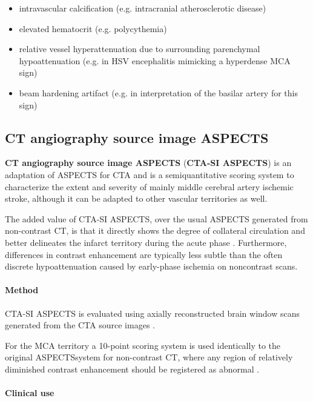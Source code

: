 \begin{tcolorbox}[colback=green!5!white,colframe=green!75!white,title=Differential diagnosis]
\begin{itemize}
	\item
	intravascular calcification (e.g. intracranial atherosclerotic disease)
	\item
	elevated hematocrit (e.g. polycythemia)
	\item
	relative vessel hyperattenuation due to surrounding parenchymal hypoattenuation (e.g. in HSV encephalitis mimicking a hyperdense MCA sign)
	\item
	beam hardening artifact (e.g. in interpretation of the basilar artery for this sign)
\end{itemize}
\end{tcolorbox}
\subsection{CT angiography source image ASPECTS}

\textbf{CT angiography source image ASPECTS} (\textbf{CTA-SI ASPECTS}) is an adaptation of ASPECTS for CTA and is a semiquantitative scoring system to characterize the extent and severity of mainly middle cerebral artery ischemic stroke, although it can be adapted to other vascular territories as well.

The added value of CTA-SI ASPECTS, over the usual ASPECTS generated from non-contrast CT, is that it directly shows the degree of collateral circulation and better delineates the infarct territory during the acute phase . Furthermore, differences in contrast enhancement are typically less subtle than the often discrete hypoattenuation caused by early-phase ischemia on noncontrast scans.

\paragraph{Method}

CTA-SI ASPECTS is evaluated using axially reconstructed brain window scans generated from the CTA source images .

For the MCA territory a 10-point scoring system is used identically to the original ASPECTSsystem for non-contrast CT, where any region of relatively diminished contrast enhancement should be registered as abnormal .

\paragraph{Clinical use}

